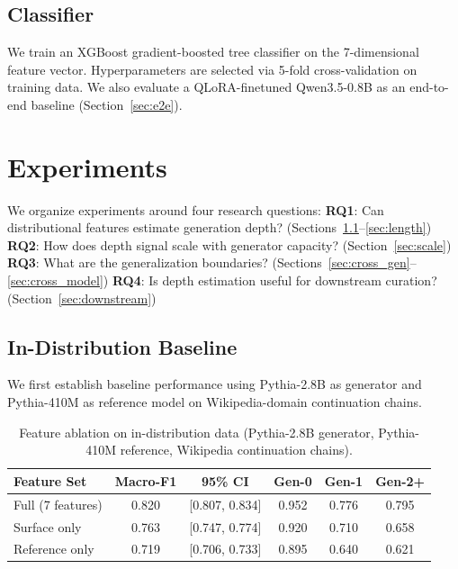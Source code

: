 \documentclass[11pt]{article}
\begin{document}
\subsection{Classifier}
We train an XGBoost gradient-boosted tree classifier on the 7-dimensional feature vector.
Hyperparameters are selected via 5-fold cross-validation on training data.
We also evaluate a QLoRA-finetuned Qwen3.5-0.8B as an end-to-end baseline (Section~\ref{sec:e2e}).

\section{Experiments}
\label{sec:experiments}

We organize experiments around four research questions:
\textbf{RQ1}: Can distributional features estimate generation depth? (Sections~\ref{sec:indist}--\ref{sec:length})
\textbf{RQ2}: How does depth signal scale with generator capacity? (Section~\ref{sec:scale})
\textbf{RQ3}: What are the generalization boundaries? (Sections~\ref{sec:cross_gen}--\ref{sec:cross_model})
\textbf{RQ4}: Is depth estimation useful for downstream curation? (Section~\ref{sec:downstream})

\subsection{In-Distribution Baseline}
\label{sec:indist}

We first establish baseline performance using Pythia-2.8B as generator and Pythia-410M as reference model on Wikipedia-domain continuation chains.

\begin{table}[h]
\centering
\caption{Feature ablation on in-distribution data (Pythia-2.8B generator, Pythia-410M reference, Wikipedia continuation chains).}
\label{tab:ablation}
\begin{tabular}{lccccc}
\toprule
Feature Set & Macro-F1 & 95\% CI & Gen-0 & Gen-1 & Gen-2+ \\
\midrule
Full (7 features) & 0.820 & [0.807, 0.834] & 0.952 & 0.776 & 0.795 \\
Surface only & 0.763 & [0.747, 0.774] & 0.920 & 0.710 & 0.658 \\
Reference only & 0.719 & [0.706, 0.733] & 0.895 & 0.640 & 0.621 \\
\bottomrule
\end{tabular}
\end{table}
\end{document}

